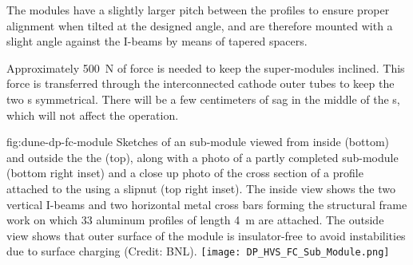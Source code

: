 The \endwall {} modules %
have a slightly larger pitch between the  profiles to ensure proper alignment when tilted at the designed angle, and are therefore  %
mounted with a slight angle against the  I-beams by means of tapered spacers. %


Approximately \SI{500}{\N} of force is needed to keep the \endwall {} super-modules inclined. This force is transferred through the interconnected cathode outer tubes to keep the %
two \endwall{}s symmetrical. There will be a few centimeters of sag in the middle of the \endwall{}s, which will not affect the  operation.   


\begin{dunefigure}{fig:dune-dp-fc-module}
{Sketches of an  sub-module viewed from inside  (bottom) and outside the the  (top), along with a photo of a partly completed sub-module (bottom right inset) and a close up photo of the cross section of a profile attached to the  using a slipnut (top right inset).  The inside view shows the two vertical  I-beams and two horizontal metal cross bars forming the structural frame work on which \num{33}  aluminum profiles of length \SI{4}{\m} are attached.  %
The outside view shows that outer surface of the  module is insulator-free to avoid  instabilities due to surface charging (Credit: BNL).
}
\texttt{[image: DP\_HVS\_FC\_Sub\_Module.png]}
\end{dunefigure}

